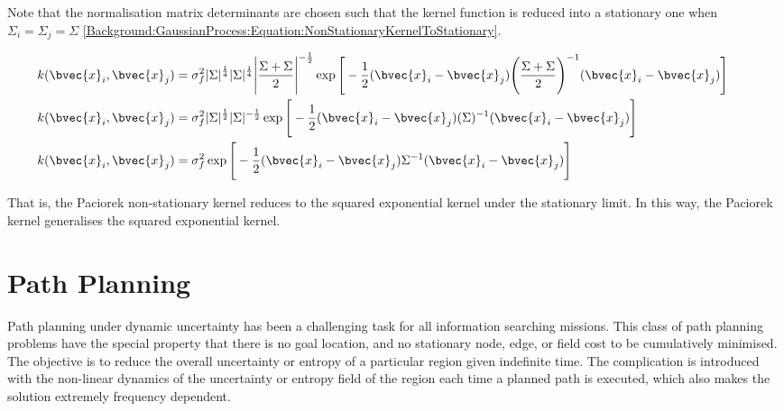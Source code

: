 			Note that the normalisation matrix determinants are chosen such that the kernel function is reduced into a stationary one when $\Sigma_{i} = \Sigma_{j} = \Sigma$ \eqref{Background:GaussianProcess:Equation:NonStationaryKernelToStationary}. 
			
			\begin{equation}
				\left.
					\begin{aligned}
						k(\bvec{x}_{i}, \bvec{x}_{j}) &= \sigma_{f}^{2} |\Sigma|^{\frac{1}{4}} |\Sigma|^{\frac{1}{4}} \Bigg|\frac{\Sigma + \Sigma}{2}\Bigg|^{-\frac{1}{2}} \exp\Bigg[ -\frac{1}{2} (\bvec{x}_{i} - \bvec{x}_{j}) \Bigg(\frac{\Sigma + \Sigma}{2}\Bigg)^{-1} (\bvec{x}_{i} - \bvec{x}_{j}) \Bigg] \\
						k(\bvec{x}_{i}, \bvec{x}_{j}) &= \sigma_{f}^{2} |\Sigma|^{\frac{1}{2}} |\Sigma|^{-\frac{1}{2}} \exp\Bigg[ -\frac{1}{2} (\bvec{x}_{i} - \bvec{x}_{j}) (\Sigma)^{-1} (\bvec{x}_{i} - \bvec{x}_{j}) \Bigg] \\
						k(\bvec{x}_{i}, \bvec{x}_{j}) &= \sigma_{f}^{2} \exp\Bigg[ -\frac{1}{2} (\bvec{x}_{i} - \bvec{x}_{j}) \Sigma^{-1} (\bvec{x}_{i} - \bvec{x}_{j}) \Bigg]
					\end{aligned}
				\qquad \right.
			\label{Background:GaussianProcess:Equation:NonStationaryKernelToStationary}
			\end{equation}		
			
			That is, the Paciorek non-stationary kernel reduces to the squared exponential kernel under the stationary limit. In this way, the Paciorek kernel generalises the squared exponential kernel.
			
			
			\FloatBarrier
			
	\section{Path Planning}
	\label{Background:PathPlanning}
	
		Path planning under dynamic uncertainty has been a challenging task for all information searching missions. This class of path planning problems have the special property that there is no goal location, and no stationary node, edge, or field cost to be cumulatively minimised. The objective is to reduce the overall uncertainty or entropy of a particular region given indefinite time. The complication is introduced with the non-linear dynamics of the uncertainty or entropy field of the region each time a planned path is executed, which also makes the solution extremely frequency dependent.
		
